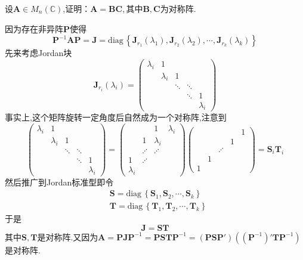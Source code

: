 \begin{brown}
    \begin{example}
        设$\bm{A}\in M_n\left(\mathbb{C}\right)$,证明：$\bm{A}=\bm{BC},$其中$\bm{B},\bm{C}$为对称阵.
    \end{example}
    \begin{Proof}
        因为存在非异阵$\bm{P}$使得\[
        \bm{P}^{-1}\bm{A}\bm{P}=\bm{J}=
        \mathrm{diag}\,\left\{
            \bm{J}_{r_1}\left(\lambda_1\right),\bm{J}_{r_2}\left(\lambda_2\right),\cdots,\bm{J}_{r_k}\left(\lambda_k\right)
        \right\}
        \]先来考虑Jordan块\[
        \bm{J}_{r_i}\left(\lambda_i\right)=\begin{pmatrix}
            \lambda_i&1&&&\\
            &\lambda_i&1&\\
            &&\ddots&\ddots&\\
            &&&\ddots&1\\
            &&&&\lambda_i
        \end{pmatrix}
        \]事实上,这个矩阵旋转一定角度后自然成为一个对称阵,注意到\[
        \begin{pmatrix}
            \lambda_i&1&&&\\
            &\lambda_i&1&\\
            &&\ddots&\ddots&\\
            &&&\ddots&1\\
            &&&&\lambda_i
        \end{pmatrix}=\begin{pmatrix}
            &&1&\lambda_i\\
            &1&\lambda_i\\
            &\iddots&\iddots&\\
            1&\iddots\\
            \lambda_i
        \end{pmatrix}\begin{pmatrix}
            &&&&1\\
            &&&1\\
            &&\iddots\\
            &1\\
            1
        \end{pmatrix}=\bm{S}_i\bm{T}_i
        \]然后推广到Jordan标准型即令\begin{align*}
           & \bm{S}=\mathrm{diag}\,\left\{
                \bm{S}_1,\bm{S}_2,\cdots,\bm{S}_k
            \right\}\\
            & \bm{T}=\mathrm{diag}\,\left\{
                \bm{T}_1,\bm{T}_2,\cdots,\bm{T}_k
            \right\}
        \end{align*}于是\[
        \bm{J}=\bm{ST}
        \]其中$\bm{S},\bm{T}$是对称阵.又因为$\bm{A}=\bm{PJP}^{-1}=\bm{PSTP}^{-1}=\left(\bm{PSP}'\right)\left(\left(\bm{P}^{-1}\right)'\bm{TP}^{-1}\right)$是对称阵.
    \end{Proof}
\end{brown}
